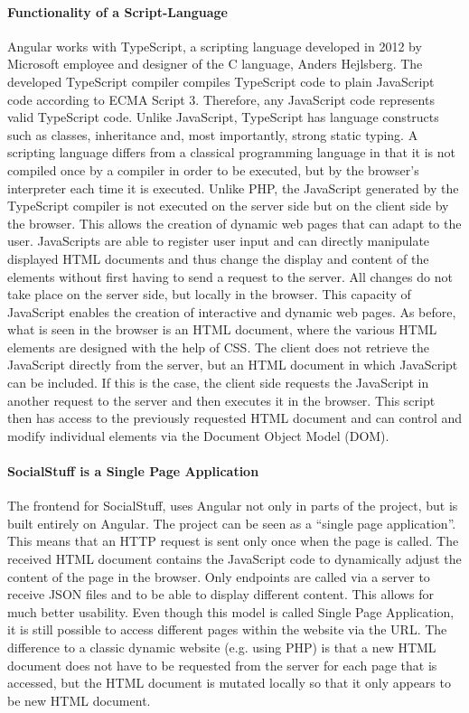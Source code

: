 \paragraph{Functionality of a Script-Language}
Angular works with TypeScript, a scripting language developed in 2012 by Microsoft employee and designer of the C
language, Anders Hejlsberg.
The developed TypeScript compiler compiles TypeScript code to plain JavaScript code according to ECMA Script 3.
Therefore, any JavaScript code represents valid TypeScript code.
Unlike JavaScript, TypeScript has language constructs such as classes, inheritance and, most importantly, strong static
typing.
A scripting language differs from a classical programming language in that it is not compiled once by a compiler in
order to be executed, but by the browser's interpreter each time it is executed.
Unlike PHP, the JavaScript generated by the TypeScript compiler is not executed on the server side but on the client
side by the browser.
This allows the creation of dynamic web pages that can adapt to the user.
JavaScripts are able to register user input and can directly manipulate displayed HTML documents and thus change the
display and content of the elements without first having to send a request to the server.
All changes do not take place on the server side, but locally in the browser.
This capacity of JavaScript enables the creation of interactive and dynamic web pages.
As before, what is seen in the browser is an HTML document, where the various HTML elements are designed with the help
of CSS.
The client does not retrieve the JavaScript directly from the server, but an HTML document in which JavaScript can be
included.
If this is the case, the client side requests the JavaScript in another request to the server and then executes it in
the browser.
This script then has access to the previously requested HTML document and can control and modify individual elements
via the Document Object Model (DOM).

\paragraph{SocialStuff is a Single Page Application}
The frontend for SocialStuff, uses Angular not only in parts of the project, but is built entirely on Angular.
The project can be seen as a \enquote{single page application}.
This means that an HTTP request is sent only once when the page is called.
The received HTML document contains the JavaScript code to dynamically adjust the content of the page in the browser.
Only endpoints are called via a server to receive JSON files and to be able to display different content.
This allows for much better usability.
Even though this model is called Single Page Application, it is still possible to access different pages within the
website via the URL. The difference to a classic dynamic website (e.g. using PHP) is that a new HTML document does not
have to be requested from the server for each page that is accessed, but the HTML document is mutated locally so that
it only appears to be new HTML document.

